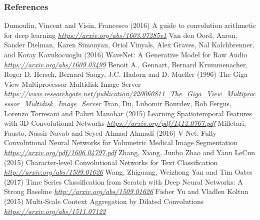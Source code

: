\begin{vbframe}
\frametitle{References}
\footnotesize{
\begin{thebibliography}{99}

 Dumoulin, Vincent and Visin, Francesco (2016)
\newblock A guide to convolution arithmetic for deep learning
\newblock \emph{\url{https://arxiv.org/abs/1603.07285v1}}
 Van den Oord, Aaron, Sander Dielman, Karen Simonyan, Oriol Vinyals, Alex Graves, Nal Kalchbrenner, and Koray Kavukocuoglu (2016)
\newblock WaveNet: A Generative Model for Raw Audio
\newblock \emph{\url{https://arxiv.org/abs/1609.03499}}
 Benoit A., Gennart, Bernard Krummenacher, Roger D. Hersch, Bernard Saugy, J.C. Hadorn and D. Mueller (1996)
\newblock The Giga View Multiprocessor Multidisk Image Server
\newblock \emph{\url{https://www.researchgate.net/publication/220060811_The_Giga_View_Multiprocessor_Multidisk_Image_Server}}
 Tran, Du, Lubomir Bourdev, Rob Fergus,  Lorenzo Torresani and Paluri Manohar (2015)
\newblock Learning Spatiotemporal Features with 3D Convolutional Networks
\newblock \emph{\url{https://arxiv.org/pdf/1412.0767.pdf}}
 Milletari, Fausto, Nassir Navab and  Seyed-Ahmad Ahmadi (2016)
\newblock V-Net: Fully Convolutional Neural Networks for
Volumetric Medical Image Segmentation
\newblock \emph{\url{https://arxiv.org/pdf/1606.04797.pdf}}
 Zhang, Xiang, Junbo Zhao and Yann LeCun (2015)
\newblock Character-level Convolutional Networks for Text Classification
\newblock \emph{\url{http://arxiv.org/abs/1509.01626}}
 Wang, Zhiguang, Weizhong Yan and Tim Oates (2017)
\newblock Time Series Classification from Scratch with Deep Neural Networks: A Strong Baseline
\newblock \emph{\url{http://arxiv.org/abs/1509.01626}}
 Fisher Yu and Vladlen Koltun (2015)
\newblock Multi-Scale Context Aggregation by Dilated Convolutions
\newblock \emph{\url{https://arxiv.org/abs/1511.07122}}

\end{thebibliography}}
\end{vbframe}
